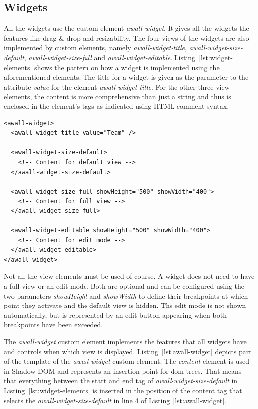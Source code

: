 \documentclass{sigchi}
\begin{document}
\subsection{Widgets}
All the widgets use the custom element \textit{awall-widget}.
It gives all the widgets the features like drag \& drop and resizability.
The four views of the widgets are also implemented by custom elements, namely \textit{awall-widget-title}, \textit{awall-widget-size-default}, \textit{awall-widget-size-full} and \textit{awall-widget-editable}.
Listing~\ref{lst:widget-elements} shows the pattern on how a widget is implemented using the aforementioned elements.
The title for a widget is given as the parameter to the attribute \textit{value} for the element \textit{awall-widget-title}.
For the other three view elements, the content is more comprehensive than just a string and thus is enclosed in the element's tags as indicated using HTML comment syntax.

\begin{lstlisting}
<awall-widget>
  <awall-widget-title value="Team" />

  <awall-widget-size-default>
    <!-- Content for default view -->
  </awall-widget-size-default>

  <awall-widget-size-full showHeight="500" showWidth="400">
    <!-- Content for full view -->
  </awall-widget-size-full>

  <awall-widget-editable showHeight="500" showWidth="400">
    <!-- Content for edit mode -->
  </awall-widget-editable>
</awall-widget>
\end{lstlisting}

Not all the view elements must be used of course.
A widget does not need to have a full view or an edit mode.
Both are optional and can be configured using the two parameters \textit{showHeight} and \textit{showWidth} to define their breakpoints at which point they activate and the default view is hidden.
The edit mode is not shown automatically, but is represented by an edit button appearing when both breakpoints have been exceeded.


The \textit{awall-widget} custom element implements the features that all widgets have and controls when which view is displayed.
Listing~\ref{lst:awall-widget} depicts part of the template of the \textit{awall-widget} custom element.
The \textit{content} element is used in Shadow DOM and represents an insertion point for \gls{dom}-trees.
That means that everything between the start and end tag of \textit{awall-widget-size-default} in Listing~\ref{lst:widget-elements} is inserted in the position of the content tag that selects the \textit{awall-widget-size-default} in line 4 of Listing~\ref{lst:awall-widget}.
\end{document}
